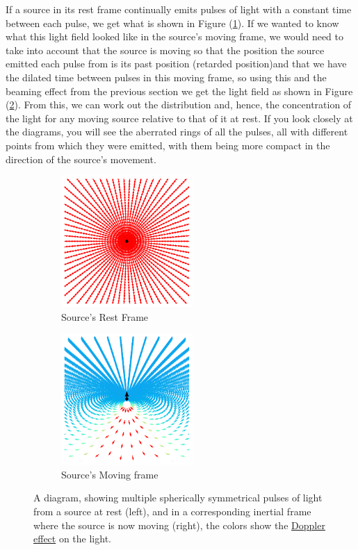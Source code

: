 If a source in its rest frame continually emits pulses of light with a constant time between each pulse, we get what is shown in Figure (\ref{fig: multiple emitting pulses rest frame}).
If we wanted to know what this light field looked like in the source's moving frame, we would need to take into account that the source is moving so that the position the source emitted each pulse from is its past position (retarded position)and that we have the dilated time between pulses in this moving frame, so using this and the beaming effect from the previous section we get the light field as shown in Figure (\ref{fig: multiple emitting pulses moving frame}).
From this, we can work out the distribution and, hence, the concentration of the light for any moving source relative to that of it at rest.
If you look closely at the diagrams, you will see the aberrated rings of all the pulses, all with different points from which they were emitted, with them being more compact in the direction of the source's movement.

\begin{figure}[H]
	\begin{subfigure}{.49\textwidth}
		\centering
		\includegraphics[width=5cm]{images/pdf/Field_Rest_Frame.pdf}
		\caption{Source's Rest Frame}
		\label{fig: multiple emitting pulses rest frame}
	\end{subfigure}
	\begin{subfigure}{.49\textwidth}
		\centering
		\includegraphics[width=5cm]{images/pdf/Field_Moving_Frame_Doppler.pdf}
		\caption{Source's Moving frame}
		\label{fig: multiple emitting pulses moving frame}
	\end{subfigure}
	\caption{A diagram, showing multiple spherically symmetrical pulses of light from a source at rest (left), and in a corresponding inertial frame where the source is now moving (right), the colors show the \protect\hyperlink{def-doppler-effect}{Doppler effect} on the light.} %
	\label{fig: full field transformation 0}
\end{figure}

